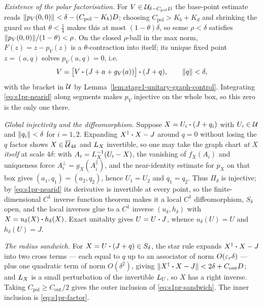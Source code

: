 \emph{Existence of the polar factorisation.} For $V\in\mathcal U_{\delta-C_{\mathrm{pol}}D}$ the
base-point estimate reads $\lVert p_V(0,0)\rVert<\delta-(C_{\mathrm{pol}}-K_b)D$; choosing
$C_{\mathrm{pol}}>K_b+K_d$ and shrinking the guard so that $\theta<\tfrac14$ makes this at
most $(1-\theta)\delta$, so some $\rho<\delta$ satisfies
$\lVert p_V(0,0)\rVert/(1-\theta)<\rho$. On the closed $\rho$-ball in the max norm,
$F(z)=z-p_V(z)$ is a $\theta$-contraction into itself; its unique fixed point $z=(a,q)$
solves $p_V(a,q)=0$, i.e.
\begin{equation}\label{eq:s1pr-factor}
  V=\bigl[V\mathbin{\bm{\cdot}}(J+a+g_V(a))\bigr]\mathbin{\bm{\cdot}}(J+q),\qquad \lVert q\rVert<\delta,
\end{equation}
with the bracket in $\mathcal U$ by Lemma~\ref{lem:stage1-unitary-graph-control}. Integrating
\eqref{eq:s1pr-nearid} along segments makes $p_V$ injective on the whole box, so this zero
is the only one there.

\emph{Global injectivity and the diffeomorphism.} Suppose $X=U_i\mathbin{\bm{\cdot}}(J+q_i)$ with
$U_i\in\mathcal U$ and $\lVert q_i\rVert<\delta$ for $i=1,2$. Expanding
$X^{\dagger}\mathbin{\bm{\cdot}} X-J$ around $q=0$ without losing the $q$ factor shows $X\in\overline{\mathcal U}_{4\delta}$ and
$L_{X}$ invertible, so one may take the graph chart \emph{at $X$ itself} at scale
$4\delta$: with $A_i=L_{X}^{-1}(U_i-X)$, the vanishing of $f_X(A_i)$ and uniqueness force
$A_i^{\perp}=g_X(A_i^{\parallel})$, and the near-identity estimate for $p_X$ on that box
gives $(a_1,q_1)=(a_2,q_2)$, hence $U_1=U_2$ and $q_1=q_2$. Thus $\Pi_\delta$ is injective;
by \eqref{eq:s1pr-nearid} its derivative is invertible at every point, so the
finite-dimensional $C^{1}$ inverse function theorem makes it a local $C^{1}$ diffeomorphism,
$S_\delta$ open, and the local inverses glue to a $C^{1}$ inverse $(u_\delta,h_\delta)$ with
$X=u_\delta(X)\mathbin{\bm{\cdot}} h_\delta(X)$. Exact unitality gives $U=U\mathbin{\bm{\cdot}} J$, whence
$u_\delta(U)=U$ and $h_\delta(U)=J$.

\emph{The radius sandwich.} For $X=U\mathbin{\bm{\cdot}}(J+q)\in S_\delta$, the star rule expands
$X^{\dagger}\mathbin{\bm{\cdot}} X-J$ into two cross terms --- each equal to $q$ up to an associator of norm
$O(\varepsilon_r\delta)$ --- plus one quadratic term of norm $O(\delta^{2})$, giving
$\lVert X^{\dagger}\mathbin{\bm{\cdot}} X-J\rVert<2\delta+C_{\mathrm{out}}D$; and $L_{X}$ is a small perturbation of
the invertible $L_{U}$, so $X$ has a right inverse. Taking
$C_{\mathrm{pol}}\ge C_{\mathrm{out}}/2$ gives the outer inclusion of
\eqref{eq:s1pr-sandwich}. The inner inclusion is \eqref{eq:s1pr-factor}.

